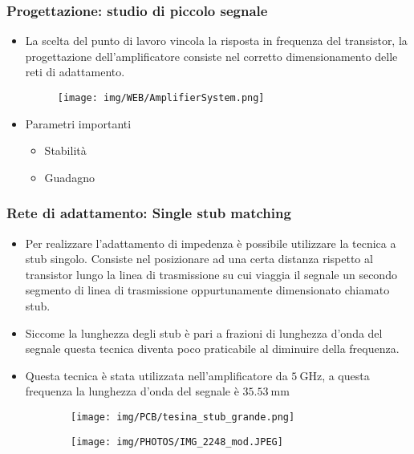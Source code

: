 \documentclass{beamer}
\begin{document}
\begin{frame}
    \frametitle{Progettazione: studio di piccolo segnale}
        
    \begin{itemize}
        
        \item<1-> La scelta del punto di lavoro vincola la risposta in frequenza del transistor, la progettazione dell'amplificatore consiste nel corretto dimensionamento delle reti di adattamento.
        \begin{figure}
            \centering
            \texttt{[image: img/WEB/AmplifierSystem.png]}
        \end{figure}
        

        \item<2->Parametri importanti
            \begin{itemize}
                    \item<1-> Stabilità
                    \item<2-> Guadagno
            \end{itemize}    
    \end{itemize}
\end{frame}

\begin{frame}
    \frametitle{Rete di adattamento: Single stub matching}
    \begin{itemize}
        \item<1-> Per realizzare l'adattamento di impedenza è possibile utilizzare la tecnica a stub singolo. Consiste nel posizionare ad una certa distanza rispetto al transistor lungo la linea di trasmissione su cui viaggia il segnale un secondo segmento di linea di trasmissione oppurtunamente dimensionato chiamato stub.
        \item<2-> Siccome la lunghezza degli stub è pari a frazioni di lunghezza d'onda del segnale questa tecnica diventa poco praticabile al diminuire della frequenza.
        \item<3-> Questa tecnica è stata utilizzata nell'amplificatore da $\SI{5}{\giga\hertz}$, a questa frequenza la lunghezza d'onda del segnale è $\SI{35.53}{\milli\meter}$
    \end{itemize}
    
    \begin{figure}[htbp]
        \begin{subfigure}[c]{0.48\textwidth}
            \texttt{[image: img/PCB/tesina\_stub\_grande.png]}
        \end{subfigure}
        \begin{subfigure}[c]{0.48\textwidth}
            \texttt{[image: img/PHOTOS/IMG\_2248\_mod.JPEG]}
        \end{subfigure}
    \end{figure}

\end{frame}
\end{document}
